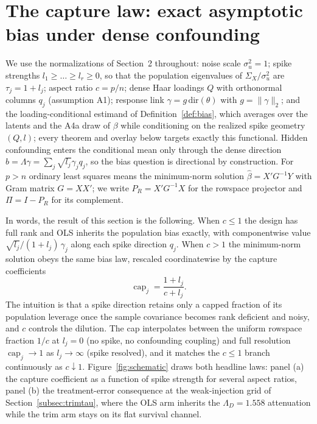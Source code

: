 \section{The capture law: exact asymptotic bias under dense confounding}\label{sec:capture}

We use the normalizations of Section~2 throughout: noise scale $\sigma_u^2=1$; spike strengths $l_1\ge\dots\ge l_r\ge 0$, so that the population eigenvalues of $\Sigma_X/\sigma_u^2$ are $\tau_j=1+l_j$; aspect ratio $c=p/n$; dense Haar loadings $Q$ with orthonormal columns $q_j$ (assumption A1); response link $\gamma=g\,\mathrm{dir}(\theta)$ with $g=\|\gamma\|_2$; and the loading-conditional estimand of Definition~\ref{def:bias}, which averages over the latents and the A4a draw of $\beta$ while conditioning on the realized spike geometry $(Q,l)$; every theorem and overlay below targets exactly this functional. Hidden confounding enters the conditional mean only through the dense direction $b=\Lambda\gamma=\sum_j \sqrt{l_j}\gamma_j q_j$, so the bias question is directional by construction. For $p>n$ ordinary least squares means the minimum-norm solution $\hat\beta=X'G^{-1}Y$ with Gram matrix $G=XX'$; we write $P_R=X'G^{-1}X$ for the rowspace projector and $\Pi=I-P_R$ for its complement.

In words, the result of this section is the following. When $c\le 1$ the design has full rank and OLS inherits the population bias exactly, with componentwise value $\sqrt{l_j}/(1+l_j)\,\gamma_j$ along each spike direction $q_j$. When $c>1$ the minimum-norm solution obeys the same bias law, rescaled coordinatewise by the capture coefficients
\[
\operatorname{cap}_j=\frac{1+l_j}{c+l_j}.
\]
The intuition is that a spike direction retains only a capped fraction of its population leverage once the sample covariance becomes rank deficient and noisy, and $c$ controls the dilution. The cap interpolates between the uniform rowspace fraction $1/c$ at $l_j=0$ (no spike, no confounding coupling) and full resolution $\operatorname{cap}_j\to 1$ as $l_j\to\infty$ (spike resolved), and it matches the $c\le 1$ branch continuously as $c\downarrow 1$. Figure~\ref{fig:schematic} draws both headline laws: panel (a) the capture coefficient as a function of spike strength for several aspect ratios, panel (b) the treatment-error consequence at the weak-injection grid of Section~\ref{subsec:trimtau}, where the OLS arm inherits the $\Lambda_D=1.558$ attenuation while the trim arm stays on its flat survival channel.

